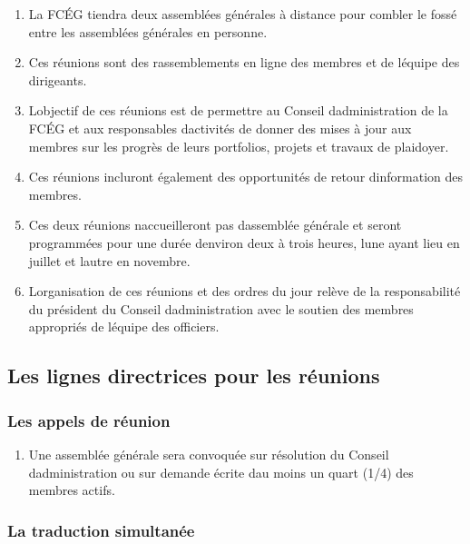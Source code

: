 \begin{enumerate}
 \item
  La FCÉG tiendra deux assemblées générales à distance pour combler le fossé entre les assemblées générales en personne.
 \item
  Ces réunions sont des rassemblements en ligne des membres et de l\textquotesingle équipe des dirigeants.
 \item
  L\textquotesingle objectif de ces réunions est de permettre au Conseil d\textquotesingle administration de la FCÉG et aux responsables d\textquotesingle activités de donner des mises à jour aux membres sur les progrès de leurs portfolios, projets et travaux de plaidoyer.
 \item
  Ces réunions incluront également des opportunités de retour d\textquotesingle information des membres.
 \item
  Ces deux réunions n\textquotesingle accueilleront pas d\textquotesingle assemblée générale et seront programmées pour une durée d\textquotesingle environ deux à trois heures, l\textquotesingle une ayant lieu en juillet et l\textquotesingle autre en novembre.
 \item
  L\textquotesingle organisation de ces réunions et des ordres du jour relève de la responsabilité du président du Conseil d\textquotesingle administration avec le soutien des membres appropriés de l\textquotesingle équipe des officiers.
\end{enumerate}

\subsection{Les lignes directrices pour les réunions}
\label{les-lignes-directrices-pour-les-reunions}

\subsubsection{Les appels de réunion}
\label{les-appels-de-reunion}

\begin{enumerate}
 \item
  Une assemblée générale sera convoquée sur résolution du Conseil d\textquotesingle administration ou sur demande écrite d\textquotesingle au moins un quart (1/4) des membres actifs.
\end{enumerate}

\subsubsection{La traduction simultanée}
\label{la-traduction-simultanee}

